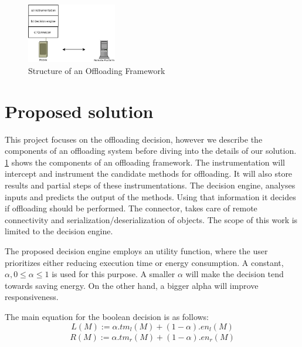 \documentclass[10pt, conference, letterpaper]{IEEEtran}
\begin{document}
\begin{figure}[!t]
  \centering
  \includegraphics[width=0.35\textwidth]{imgs/system.jpeg}
  \caption{Structure of an Offloading Framework}
  \label{fig:systemDiagram}
\end{figure}

  \section{Proposed solution} \label{sec:design}

  This project focuses on the offloading decision, however we describe the components of an offloading system before diving into the details of our solution. \ref{fig:systemDiagram} shows the components of an offloading framework. The instrumentation will intercept and instrument the candidate methods for offloading. It will also store results and partial steps of these instrumentations. The decision engine, analyses inputs and predicts the output of the methods. Using that information it decides if offloading should be performed. The connector, takes care of remote connectivity and serialization/deserialization of objects.  The scope of this work is limited to the decision engine.

  The proposed decision engine employs an utility function, where the user prioritizes either reducing execution time or energy consumption. A constant, $\alpha, 0 \leq \alpha \leq 1$ is used for this purpose. A smaller $\alpha$ will make the decision tend towards saving energy. On the other hand, a bigger alpha will improve responsiveness. 

  The main equation for the boolean decision is as follows:
  \begin{equation} \label{eq:localutility}
    L(M) := \alpha . tm_{l}(M) + (1-\alpha) . en_{l}(M) 
  \end{equation}
  \begin{equation} \label{eq:remoteutility}
  \begin{multlined}
    R(M) := \alpha . tm_{r}(M) + (1-\alpha) . en_{r}(M) 
  \end{multlined}
  \end{equation}
\end{document}

